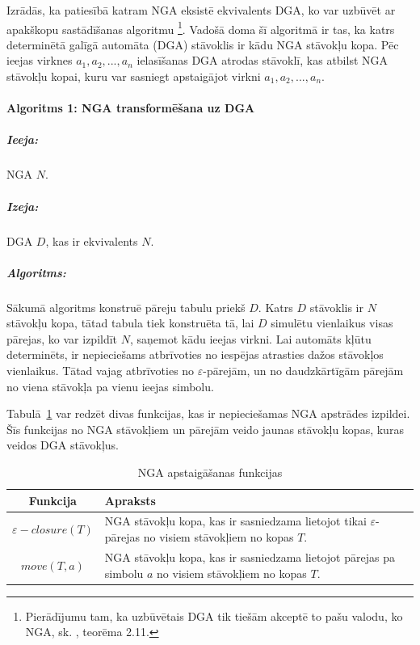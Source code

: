 Izrādās, ka patiesībā katram NGA eksistē ekvivalents DGA, ko var uzbūvēt ar apakškopu sastādīšanas algoritmu \footnote{Pierādījumu tam, ka uzbūvētais DGA tik tiešām akceptē to pašu valodu, ko NGA, sk.  \cite{Hopcroft:IntroAutomataTheory}, teorēma 2.11.}. Vadošā doma šī algoritmā ir tas, ka katrs determinētā galīgā automāta (DGA) stāvoklis ir kādu NGA stāvokļu kopa. Pēc ieejas virknes $a_1, a_2, ..., a_n$ ielasīšanas DGA atrodas stāvoklī, kas atbilst NGA stāvokļu kopai, kuru var sasniegt apstaigājot virkni $a_1, a_2, ..., a_n$.

\paragraph*{Algoritms 1: NGA transformēšana uz DGA}
\subparagraph{Ieeja:}NGA $N$.
\subparagraph{Izeja:}DGA $D$, kas ir ekvivalents $N$.
\subparagraph{Algoritms:} Sākumā algoritms konstruē pāreju tabulu priekš $D$. Katrs $D$ stāvoklis ir $N$ stāvokļu kopa, tātad tabula tiek konstruēta tā, lai $D$ simulētu vienlaikus visas pārejas, ko var izpildīt $N$, saņemot kādu ieejas virkni. Lai automāts kļūtu determinēts, ir nepieciešams atbrīvoties no iespējas atrasties dažos stāvokļos vienlaikus. Tātad vajag atbrīvoties no $\varepsilon$-pārejām, un no daudzkārtīgām pārejām no viena stāvokļa pa vienu ieejas simbolu.

Tabulā~\ref{fig:NGAoperations} var redzēt divas funkcijas, kas ir nepieciešamas NGA apstrādes izpildei. Šīs funkcijas no NGA stāvokļiem un pārejām veido jaunas stāvokļu kopas, kuras veidos DGA stāvokļus.

\begin{table}[htdp]
  \caption{NGA apstaigāšanas funkcijas}
  \centering
  \begin{tabular}{|c|p{350pt}|}
    \hline
    Funkcija & Apraksts \\ \hline
    $\varepsilon-closure (T)$ & 
    NGA stāvokļu kopa, kas ir sasniedzama lietojot tikai $\varepsilon$-pārejas no visiem stāvokļiem no kopas $T$. \\ \hline
    $move (T, a)$ & 
    NGA stāvokļu kopa, kas ir sasniedzama lietojot pārejas pa simbolu $a$ no visiem stāvokļiem no kopas $T$. \\
    \hline
  \end{tabular}
\label{fig:NGAoperations}
\end{table}

